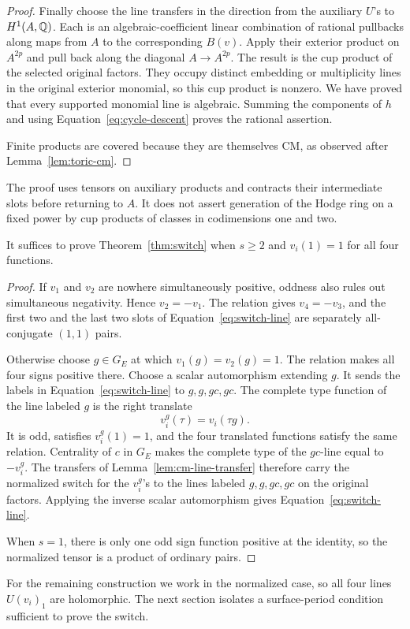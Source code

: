 \begin{proof}
Finally choose the line transfers in the direction from the auxiliary
\(U\)'s to \(H^1(A,\mathbb{Q})\).  Each is an algebraic-coefficient linear
combination of rational pullbacks along maps from \(A\) to the
corresponding \(B(v)\).  Apply their exterior product on \(A^{2p}\)
and pull back along the diagonal \(A\to A^{2p}\).  The result is the
cup product of the selected original factors.  They occupy distinct
embedding or multiplicity lines in the original exterior monomial,
so this cup product is nonzero.  We have proved that every supported
monomial line is algebraic.  Summing the components of \(h\) and
using Equation~\eqref{eq:cycle-descent} proves the rational assertion.

Finite products are covered because they are themselves CM,
as observed after Lemma~\ref{lem:toric-cm}.
\end{proof}

The proof uses tensors on auxiliary products and contracts their
intermediate slots before returning to \(A\).  It does not assert
generation of the Hodge ring on a fixed power by cup products of
classes in codimensions one and two.

\begin{lemma}
 \label{lem:switch-normalization}
It suffices to prove Theorem~\ref{thm:switch} when \(s\geq2\) and
\(v_i(1)=1\) for all four functions.
\end{lemma}

\begin{proof}
If \(v_1\) and \(v_2\) are nowhere simultaneously positive, oddness
also rules out simultaneous negativity.  Hence \(v_2=-v_1\).
The relation gives \(v_4=-v_3\), and the first two and the last two
slots of Equation~\eqref{eq:switch-line} are separately
all-conjugate \((1,1)\) pairs.

Otherwise choose \(g\in G_E\) at which \(v_1(g)=v_2(g)=1\).  The
relation makes all four signs positive there.  Choose a scalar
automorphism extending \(g\).  It sends the labels in
Equation~\eqref{eq:switch-line} to \(g,g,gc,gc\).  The complete type
function of the line labeled \(g\) is the right translate
\[
 v_i^g(\tau)=v_i(\tau g).
\]
It is odd, satisfies \(v_i^g(1)=1\), and the four translated functions
satisfy the same relation.  Centrality of \(c\) in \(G_E\) makes the
complete type of the \(gc\)-line equal to \(-v_i^g\).  The
transfers of Lemma~\ref{lem:cm-line-transfer} therefore carry the
normalized switch for the \(v_i^g\)'s to the lines labeled
\(g,g,gc,gc\) on the original factors.  Applying the inverse scalar
automorphism gives Equation~\eqref{eq:switch-line}.

When \(s=1\), there is only one odd sign function positive at the
identity, so the normalized tensor is a product of ordinary pairs.
\end{proof}

For the remaining construction we work in the normalized case, so
all four lines \(U(v_i)_1\) are holomorphic.  The next section
isolates a surface-period condition sufficient to prove the switch.
